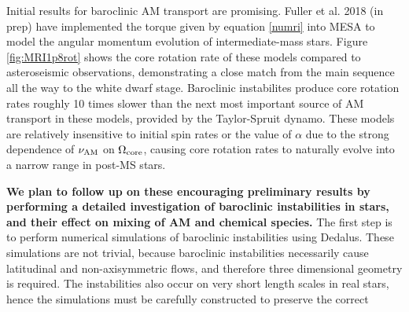 Initial results for baroclinic AM transport are promising. Fuller et al. 2018 (in prep) have implemented the torque given by equation \ref{numri} into MESA to model the angular momentum evolution of intermediate-mass stars. Figure \ref{fig:MRI1p8rot} shows the core rotation rate of these models compared to asteroseismic observations, demonstrating a close match from the main sequence all the way to the white dwarf stage. Baroclinic instabilites produce core rotation rates roughly 10 times slower than the next most important source of AM transport in these models, provided by the Taylor-Spruit dynamo. These models are relatively insensitive to initial spin rates or the value of $\alpha$ due to the strong dependence of $\nu_{\rm AM}$ on $\Omega_{\rm core}$, causing core rotation rates to naturally evolve into a narrow range in post-MS stars.

{\bf We plan to follow up on these encouraging preliminary results by performing a detailed investigation of baroclinic instabilities in stars, and their effect on mixing of AM and chemical species.} The first step is to perform numerical simulations of baroclinic instabilities using Dedalus. These simulations are not trivial, because baroclinic instabilities necessarily cause latitudinal and non-axisymmetric flows, and therefore three dimensional geometry is required. The instabilities also occur on very short length scales in real stars, hence the simulations must be carefully constructed to preserve the correct 